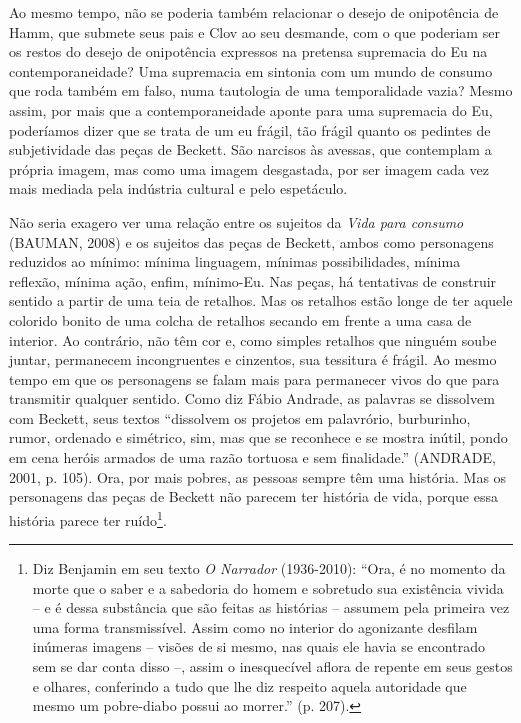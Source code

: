Ao mesmo tempo, não se poderia também relacionar o desejo de onipotência
de Hamm, que submete seus pais e Clov ao seu desmande, com o que
poderiam ser os restos do desejo de onipotência expressos na pretensa
supremacia do Eu na contemporaneidade? Uma supremacia em sintonia com um
mundo de consumo que roda também em falso, numa tautologia de uma
temporalidade vazia? Mesmo assim, por mais que a contemporaneidade
aponte para uma supremacia do Eu, poderíamos dizer que se trata de um eu
frágil, tão frágil quanto os pedintes de subjetividade das peças de
Beckett. São narcisos às avessas, que contemplam a própria imagem, mas
como uma imagem desgastada, por ser imagem cada vez mais mediada pela
indústria cultural e pelo espetáculo.

Não seria exagero ver uma relação entre os sujeitos da \emph{Vida para
consumo} (BAUMAN, 2008) e os sujeitos das peças de Beckett, ambos como
personagens reduzidos ao mínimo: mínima linguagem, mínimas
possibilidades, mínima reflexão, mínima ação, enfim, mínimo-Eu. Nas
peças, há tentativas de construir sentido a partir de uma teia de
retalhos. Mas os retalhos estão longe de ter aquele colorido bonito de
uma colcha de retalhos secando em frente a uma casa de interior. Ao
contrário, não têm cor e, como simples retalhos que ninguém soube
juntar, permanecem incongruentes e cinzentos, sua tessitura é frágil. Ao
mesmo tempo em que os personagens se falam mais para permanecer vivos do
que para transmitir qualquer sentido. Como diz Fábio Andrade, as
palavras se dissolvem com Beckett, seus textos ``dissolvem os projetos
em palavrório, burburinho, rumor, ordenado e simétrico, sim, mas que se
reconhece e se mostra inútil, pondo em cena heróis armados de uma razão
tortuosa e sem finalidade.'' (ANDRADE, 2001, p. 105). Ora, por mais
pobres, as pessoas sempre têm uma história. Mas os personagens das peças
de Beckett não parecem ter história de vida, porque essa história parece
ter ruído\footnote{Diz Benjamin em seu texto \emph{O Narrador}
  (1936-2010): ``Ora, é no momento da morte que o saber e a sabedoria do
  homem e sobretudo sua existência vivida -- e é dessa substância que
  são feitas as histórias -- assumem pela primeira vez uma forma
  transmissível. Assim como no interior do agonizante desfilam inúmeras
  imagens -- visões de si mesmo, nas quais ele havia se encontrado sem
  se dar conta disso --, assim o inesquecível aflora de repente em seus
  gestos e olhares, conferindo a tudo que lhe diz respeito aquela
  autoridade que mesmo um pobre-diabo possui ao morrer.'' (p. 207).}.

